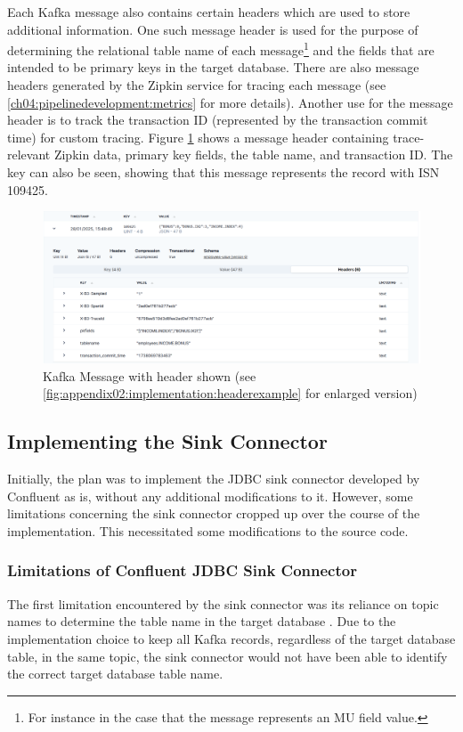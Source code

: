 Each Kafka message also contains certain headers which are used to store additional information. One such message header is used for the purpose of determining the relational table name of each message\footnote{For instance in the case that the message represents an MU field value.} and the fields that are intended to be primary keys in the target database. There are also message headers generated by the Zipkin service for tracing each message (see \ref{ch04:pipelinedevelopment:metrics} for more details). Another use for the message header is to track the transaction ID (represented by the transaction commit time) for custom tracing. Figure \ref{fig:chapter04:implementation:headerexample} shows a message header containing trace-relevant Zipkin data, primary key fields, the table name, and transaction ID. The key can also be seen, showing that this message represents the record with \ac{ISN} 109425.

\begin{figure}[htbp]
 \centering
 \includegraphics[width=1\textwidth]{chapters/images/header-example.png}
 \caption[Kafka Message with header shown]{Kafka Message with header shown (see \ref{fig:appendix02:implementation:headerexample} for enlarged version)}
 \label{fig:chapter04:implementation:headerexample}
\end{figure}


\subsection{Implementing the Sink Connector}
Initially, the plan was to implement the \ac{JDBC} sink connector developed by Confluent as is, without any additional modifications to it. However, some limitations concerning the sink connector cropped up over the course of the implementation. This necessitated some modifications to the source code.

\subsubsection{Limitations of Confluent JDBC Sink Connector}
The first limitation encountered by the sink connector was its reliance on topic names to determine the table name in the target database \cite{jdbcsinkdocumentation}. Due to the implementation choice to keep all Kafka records, regardless of the target database table, in the same topic, the sink connector would not have been able to identify the correct target database table name.

